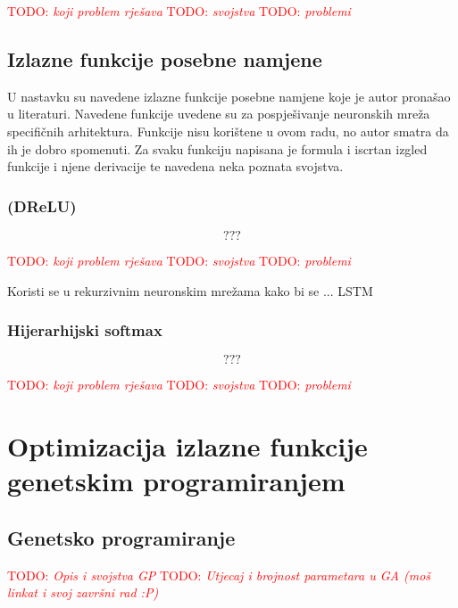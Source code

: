 \documentclass[times, utf8, numeric, diplomski]{fer}
\def\TODO#1{\noindent\textcolor{red}{TODO: \textit{#1}}\newline}
\def\todo#1{\TODO{#1}}
\def\todoimg#1{\begin{center} \textcolor{red}{\big[ IMAGE: \textit{#1} \big]} \end{center}}
\begin{document}
\todo{koji problem rješava}
\todo{svojstva}
\todo{problemi}

\section{Izlazne funkcije posebne namjene}
U nastavku su navedene izlazne funkcije posebne namjene koje je autor pronašao u literaturi. Navedene funkcije uvedene su za pospješivanje neuronskih mreža specifičnih arhitektura. Funkcije nisu korištene u ovom radu, no autor smatra da ih je dobro spomenuti. Za svaku funkciju napisana je formula i iscrtan izgled funkcije i njene derivacije te navedena neka poznata svojstva.

\subsection{(DReLU)}

\todoimg{}

\begin{equation}
???
\end{equation}

\todo{koji problem rješava}
\todo{svojstva}
\todo{problemi}

Koristi se u rekurzivnim neuronskim mrežama kako bi se ... LSTM

\subsection{Hijerarhijski softmax}

\todoimg{}

\begin{equation}
???
\end{equation}

\todo{koji problem rješava}
\todo{svojstva}
\todo{problemi}
\fi %

\chapter{Optimizacija izlazne funkcije genetskim programiranjem}

\section{Genetsko programiranje}
\todo{Opis i svojstva GP}
\todo{Utjecaj i brojnost parametara u GA (moš linkat i svoj završni rad :P)}
\end{document}
